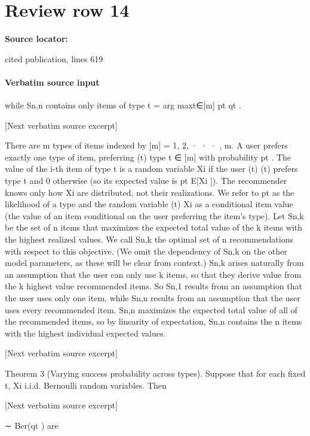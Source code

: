 \documentclass[10pt]{article}
\begin{document}
\section*{Review row 14}
\textbf{Source locator:} {\footnotesize\raggedright cited publication, lines 619\par}
\paragraph{Verbatim source input}
\begin{ReviewVerbatim}
while Sn,n contains only items of type t = arg maxt∈[m] pt qt .

[Next verbatim source excerpt]

There are m types of items indexed by [m] = {1, 2, · · · , m}. A user prefers exactly one type of item, preferring
(t)
type t ∈ [m] with probability pt . The value of the i-th item of type t is a random variable Xi if the user
(t)
(t)
prefers type t and 0 otherwise (so its expected value is pt E[Xi ]). The recommender knows only how Xi
are distributed, not their realizations. We refer to pt as the likelihood of a type and the random variable
(t)
Xi as a conditional item value (the value of an item conditional on the user preferring the item’s type).
Let Sn,k be the set of n items that maximizes the expected total value of the k items with the highest
realized values. We call Sn,k the optimal set of n recommendations with respect to this objective. (We omit
the dependency of Sn,k on the other model parameters, as these will be clear from context.)
Sn,k arises naturally from an assumption that the user can only use k items, so that they derive value
from the k highest value recommended items. So Sn,1 results from an assumption that the user uses only
one item, while Sn,n results from an assumption that the user uses every recommended item.
Sn,n maximizes the expected total value of all of the recommended items, so by linearity of expectation,
Sn,n contains the n items with the highest individual expected values.

[Next verbatim source excerpt]

Theorem 3 (Varying success probability across types). Suppose that for each fixed t, Xi
i.i.d. Bernoulli random variables. Then

[Next verbatim source excerpt]

∼ Ber(qt ) are
\end{ReviewVerbatim}
\end{document}
